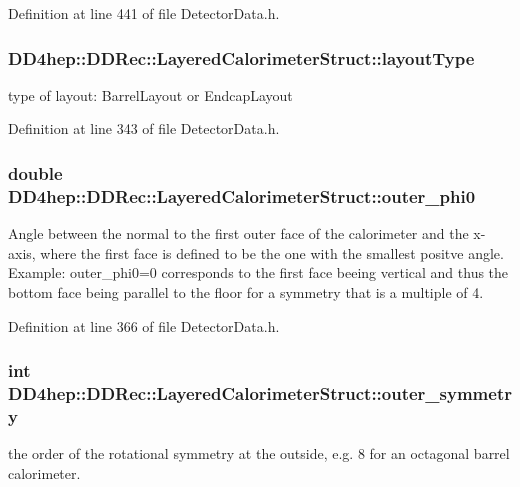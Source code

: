 Definition at line 441 of file DetectorData.h.\hypertarget{struct_d_d4hep_1_1_d_d_rec_1_1_layered_calorimeter_struct_a141e4dca7fb6f24249a79912e18e964d}{
\subsubsection[{layoutType}]{ {\bf DD4hep::DDRec::LayeredCalorimeterStruct::layoutType}}}
\label{struct_d_d4hep_1_1_d_d_rec_1_1_layered_calorimeter_struct_a141e4dca7fb6f24249a79912e18e964d}


type of layout: BarrelLayout or EndcapLayout 

Definition at line 343 of file DetectorData.h.\hypertarget{struct_d_d4hep_1_1_d_d_rec_1_1_layered_calorimeter_struct_a4fa8650165dff7097401fa4a6de40f89}{
\subsubsection[{outer\_\-phi0}]{\setlength{\rightskip}{0pt plus 5cm}double {\bf DD4hep::DDRec::LayeredCalorimeterStruct::outer\_\-phi0}}}
\label{struct_d_d4hep_1_1_d_d_rec_1_1_layered_calorimeter_struct_a4fa8650165dff7097401fa4a6de40f89}
Angle between the normal to the first outer face of the calorimeter and the x-\/axis, where the first face is defined to be the one with the smallest positve angle. Example: outer\_\-phi0=0 corresponds to the first face beeing vertical and thus the bottom face being parallel to the floor for a symmetry that is a multiple of 4. 

Definition at line 366 of file DetectorData.h.\hypertarget{struct_d_d4hep_1_1_d_d_rec_1_1_layered_calorimeter_struct_a6adea28c87118351ef0854a54ed106b5}{
\subsubsection[{outer\_\-symmetry}]{\setlength{\rightskip}{0pt plus 5cm}int {\bf DD4hep::DDRec::LayeredCalorimeterStruct::outer\_\-symmetry}}}
\label{struct_d_d4hep_1_1_d_d_rec_1_1_layered_calorimeter_struct_a6adea28c87118351ef0854a54ed106b5}
the order of the rotational symmetry at the outside, e.g. 8 for an octagonal barrel calorimeter. 

